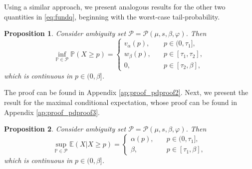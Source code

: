 \documentclass[11pt]{article}
\newtheorem{proposition}{Proposition}[section]
\newcommand{\bP}{\mathbb{P}}
\newcommand{\cP}{\mathcal{P}}
\newcommand{\bE}{\mathbb{E}}
\newcommand{\1}{\mathds{1}}
\begin{document}
Using a similar approach, we present analogous results for the other two quantities in \eqref{eq:fundq}, beginning with the worst-case tail-probability.
\begin{proposition}\label{prop:inf_tp}
    Consider ambiguity set $\cP = \cP(\mu,s,\beta,\varphi)$. Then
    \begin{equation}
    \inf_{\bP \in \cP}\bP(X \geq p)=
    \begin{cases}
     v_\alpha(p), \quad & p\in(0,\tau_1], \\
      w_{\beta}(p), \quad & p\in[\tau_1,\tau_2], \\
    0, & p \in[\tau_2,\beta],
    \end{cases}
\end{equation}\label{eq:tailinf}
which is continuous in $p \in (0,\beta]$.
\end{proposition}
The proof can be found in Appendix \ref{ap:proof_pdproof2}. Next, we present the result for the maximal conditional expectation, whose proof can be found in Appendix \ref{ap:proof_pdproof3}.

\begin{proposition}\label{prop:sup_ce}
    Consider ambiguity set $\cP = \cP(\mu,s,\beta,\varphi)$. Then
    \begin{equation}
    \sup_{\bP \in \cP}\bE(X | X \geq p)=
    \begin{cases}
     \alpha(p), \quad & p\in(0,\tau_1], \\
     \beta, & p \in[\tau_1,\beta],
    \end{cases}
\end{equation}\label{eq:supcond}
which is continuous in $p \in (0,\beta]$.
\end{proposition}
\end{document}
